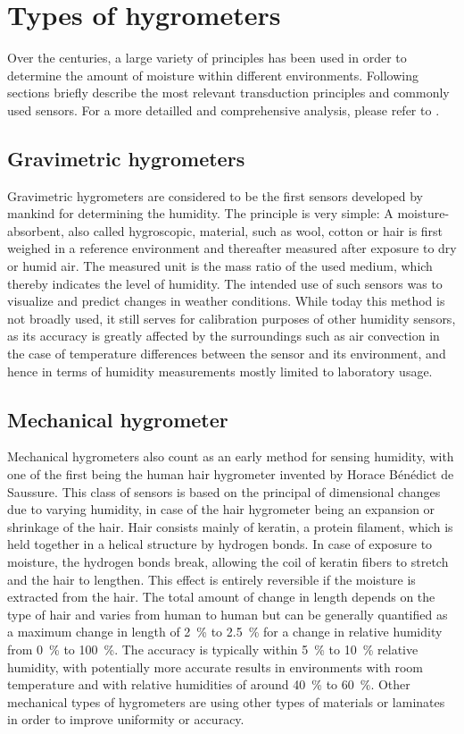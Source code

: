 \section{Types of hygrometers}\label{s:hygrometertypes}
Over the centuries, a large variety of principles has been used in order to determine the amount of moisture within different environments. Following sections briefly describe the most relevant transduction principles and commonly used sensors. For a more detailled and comprehensive analysis, please refer to \autocite{fontesHumiditySensors2005,korotcenkovHandbookHumidityMeasurement2018,korotcenkovHandbookHumidityMeasurement2019,rittersmaRecentAchievementsMiniaturised2002a}.

\subsection{Gravimetric hygrometers}
Gravimetric hygrometers are considered to be the first sensors developed by mankind for determining the humidity. The principle is very simple: A moisture-absorbent, also called hygroscopic, material, such as wool, cotton or hair is first weighed in a reference environment and thereafter measured after exposure to dry or humid air. The measured unit is the mass ratio of the used medium, which thereby indicates the level of humidity. The intended use of such sensors was to visualize and predict changes in weather conditions. While today this method is not broadly used, it still serves for calibration purposes of other humidity sensors, as its accuracy is greatly affected by the surroundings such as air convection in the case of temperature differences between the sensor and its environment, and hence in terms of humidity measurements mostly limited to laboratory usage.

\subsection{Mechanical hygrometer}
Mechanical hygrometers also count as an early method for sensing humidity, with one of the first being the human hair hygrometer invented by Horace Bénédict de Saussure. This class of sensors is based on the principal of dimensional changes due to varying humidity, in case of the hair hygrometer being an expansion or shrinkage of the hair. Hair consists mainly of keratin, a protein filament, which is held together in a helical structure by hydrogen bonds. In case of exposure to moisture, the hydrogen bonds break, allowing the coil of keratin fibers to stretch and the hair to lengthen. This effect is entirely reversible if the moisture is extracted from the hair. The total amount of change in length depends on the type of hair and varies from human to human but can be generally quantified as a maximum change in length of \qty{2}{\%} to \qty{2.5}{\%} for a change in relative humidity from \qty{0}{\%} to \qty{100}{\%}. The accuracy is typically within \qty{5}{\%} to \qty{10}{\%} relative humidity, with potentially more accurate results in environments with room temperature and with relative humidities of around \qty{40}{\%} to \qty{60}{\%}. Other mechanical types of hygrometers are using other types of materials or laminates in order to improve uniformity or accuracy.

